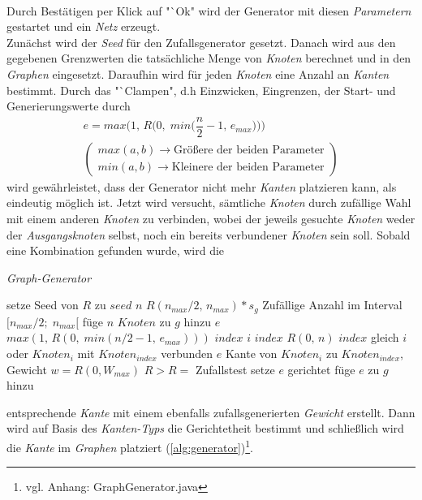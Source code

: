 \documentclass[12pt]{article}
\begin{document}
\\
Durch Bestätigen per Klick auf "`Ok" wird der Generator mit diesen \textit{Parametern} gestartet und ein \textit{Netz} erzeugt.
\\
Zunächst wird der \textit{Seed} für den Zufallsgenerator gesetzt. Danach wird aus den gegebenen Grenzwerten die tatsächliche Menge von \textit{Knoten} berechnet und in den \textit{Graphen} eingesetzt. Daraufhin wird für jeden \textit{Knoten} eine Anzahl an \textit{Kanten} bestimmt. Durch das "`Clampen", d.h Einzwicken, Eingrenzen, der Start- und Generierungswerte durch
\vspace{-20pt}
\begin{gather*}
e = max\Big(1,\,R\Big(0,\;min\Big(\dfrac{n}{2}-1,\,e_{max}\Big)\Big)\Big) \\
\left(\begin{aligned}
max(a, b) \to \text{Größere der beiden Parameter}\\
min(a, b) \to \text{Kleinere der beiden Parameter}
\end{aligned}
\right)
\end{gather*}
wird gewährleistet, dass der Generator nicht mehr \textit{Kanten} platzieren kann, als eindeutig möglich ist. Jetzt wird versucht, sämtliche \textit{Knoten} durch zufällige Wahl mit einem anderen \textit{Knoten} zu verbinden, wobei der jeweils gesuchte \textit{Knoten} weder der \textit{Ausgangsknoten} selbst, noch ein bereits verbundener \textit{Knoten} sein soll. Sobald eine Kombination gefunden wurde, wird die 
\begin{algorithm}
\caption{\textit{Graph-Generator} \label{alg:generator}}
\begin{algorithmic}[1]
\Statex
{}
\Statex
{}
	\State setze Seed von $R$ zu $seed$
	\State \sei $n$ $R(n_{max}/2,\,n_{max}) * s_g$ \Comment Zufällige Anzahl im Interval $\big[n_{max}/2;\;n_{max}\big[$
	\State füge $n$ $Knoten$ zu $g$ hinzu
		\State \sei $e$ $max(1,\,R(0,\;min(n/2-1,\,e_{max})))$
			\State \sei $index$ $i$
			\Repeat 
			\State \sei $index$ $R(0,\,n)$
			\Until $index$ gleich $i$ oder $Knoten_i$ mit $Knoten_{index}$ verbunden
			\State \sei $e$ Kante von $Knoten_i$ zu $Knoten_{index}$, Gewicht $w = R(0, W_{max})$
			 \State \Comment $R>R =$ Zufallstest
				\State setze $e$ gerichtet
			\EndIf
			\State füge $e$ zu $g$ hinzu
		\EndFor
	\EndFor
\EndProcedure
\end{algorithmic}
\end{algorithm}
entsprechende \textit{Kante} mit einem ebenfalls zufallsgenerierten \textit{Gewicht} erstellt. Dann wird auf Basis des \textit{Kanten-Typs} die Gerichtetheit bestimmt und schließlich wird die \textit{Kante} im \textit{Graphen} platziert (\autoref{alg:generator})\footnote{vgl. Anhang: GraphGenerator.java}.
\end{document}
